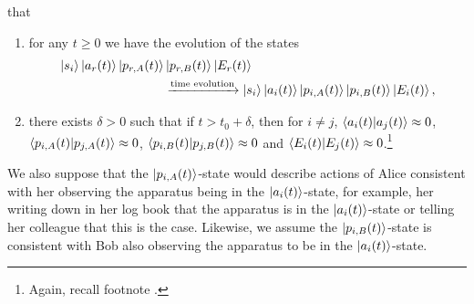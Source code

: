    that 
%
    \begin{enumerate}[noitemsep, nosep, topsep=0pt]
    \item for any $t\geq 0$ we have the evolution of the states 
    \begin{align*}\ket{s_i}\ket{a_r(t)}\ket{p_{r, A}(t)}&\ket{p_{r, B}(t)}\ket{E_r(t)}\\ &\xrightarrow{\text{time evolution}}\ket{s_i}\ket{a_i(t)}\ket{p_{i, A}(t)}\ket{p_{i, B}(t)}\ket{E_i(t)},\end{align*}
    \item there exists $\delta>0$ such that if $t>t_0+\delta$, then for $i\neq j$, $\ip{a_i(t)}{a_j(t)}\approx 0$, $\ip{p_{i, A}(t)}{p_{j, A}(t)}\approx 0$, $\ip{p_{i, B}(t)}{p_{j, B}(t)}\approx 0$ and $\ip{E_i(t)}{E_j(t)}\approx 0$.\footnote{Again, recall footnote .}
    \end{enumerate}
    We also suppose that the $\ket{p_{i,A}(t)}$-state would describe actions of Alice consistent with her observing the apparatus being in the $\ket{a_i(t)}$-state, for example, her writing down in her log book that the apparatus is in the $\ket{a_i(t)}$-state or telling her colleague that this is the case. Likewise, we assume the $\ket{p_{i,B}(t)}$-state is consistent with Bob also observing the apparatus to be in the $\ket{a_i(t)}$-state.
    
